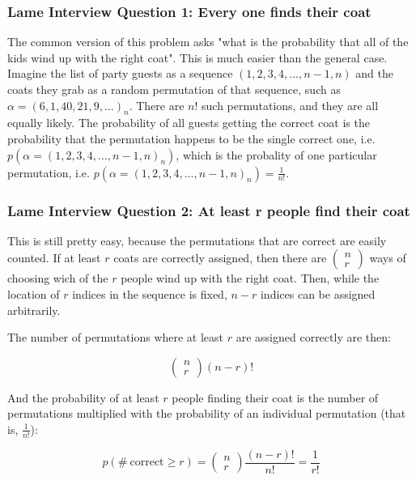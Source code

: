 \subsubsection{Lame Interview Question 1: Every one finds their coat}
The common version of this problem asks "what is the probability that all of the kids wind up with the right coat". This is much easier than the general case. Imagine the list of party guests as a sequence $(1,2,3,4,...,n-1,n)$ and the coats they grab as a random permutation of that sequence, such as $\alpha = (6,1,40,21,9,...)_n$. There are $n!$ such permutations, and they are all equally likely. The probability of all guests getting the correct coat is the probability that the permutation happens to be the single correct one, i.e. $p(\alpha = (1,2,3,4,...,n-1,n)_n)$, which is the probality of one particular permutation, i.e. $p(\alpha = (1,2,3,4,...,n-1,n)_n) = \frac{1}{n!}$.

\subsubsection{Lame Interview Question 2: At least r people find their coat}
This is still pretty easy, because the permutations that are correct are easily counted. If at least $r$ coats are correctly assigned, then there are $\left(\begin{array}{l}n\\r\end{array}\right)$ ways of choosing wich of the $r$ people wind up with the right coat. Then, while the location of $r$ indices in the sequence is fixed, $n-r$ indices can be assigned arbitrarily.

The number of permutations where at least $r$ are assigned correctly are then:

\begin{equation}
\left(
\begin{array}{l}
n\\
r
\end{array}
\right)(n-r)!
\end{equation}

And the probability of at least $r$ people finding their coat is the number of permutations multiplied with the probability of an individual permutation (that is, $\frac{1}{n!}$):

\begin{equation}
p(\mathrm{\#\ correct} \geq r)=\left(
\begin{array}{l}
n\\
r
\end{array}
\right)\frac{(n-r)!}{n!} = \frac{1}{r!}
\end{equation}

